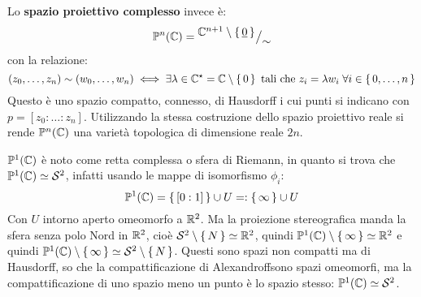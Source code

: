 Lo \textbf{spazio proiettivo complesso} invece è:
\[
  \mathbb{P}^{n} (\mathbb{C}) = {^{\textstyle \mathbb{C}^{n+1} \setminus \set{\underline{0}}}\big/_{\textstyle \sim}}
\]
con la relazione:
\[
  (z_0, \dots, z_n) \sim (w_0, \dots, w_n) \iff \exists \lambda \in \mathbb{C}^\star= \mathbb{C} \setminus \set{0} \text{ tali che } z_i = \lambda w_i \; \forall i \in \set{0, \dots, n}
\]
Questo è uno spazio compatto, connesso, di Hausdorff i cui punti si indicano con
$ p = [z_0 : \dots : z_n] $. Utilizzando la stessa costruzione dello spazio proiettivo
reale si rende $ \mathbb{P}^{n} (\mathbb{C}) $ una varietà topologica di dimensione reale $ 2n $.
\begin{example}[$ n = 1 $]
  $ \mathbb{P}^{1} (\mathbb{C}) $ è noto come retta complessa o sfera di Riemann, in quanto
  si trova che $ \mathbb{P}^{1} (\mathbb{C}) \simeq \mathcal{S}^{2} $, infatti usando le mappe di isomorfismo $ \phi_i $:
  \[
    \mathbb{P}^{1} (\mathbb{C}) = \set{ [0:1] } \cup U =: \set{\infty} \cup U
  \]
  Con $ U $ intorno aperto omeomorfo a $ \mathbb{R}^{2} $. Ma la proiezione
  stereografica manda la sfera senza polo Nord in $ \mathbb{R}^{2} $, cioè
  $ \mathcal{S}^{2} \setminus \set{N} \simeq \mathbb{R}^{2} $, quindi
  $ \mathbb{P}^{1} (\mathbb{C}) \setminus \set{\infty} \simeq \mathbb{R}^{2} $ e quindi
  $ \mathbb{P}^{1} (\mathbb{C}) \setminus \set{\infty} \simeq \mathcal{S}^{2} \setminus \set{N} $. Questi sono spazi non compatti ma
  di Hausdorff, so che la compattificazione di Alexandroff\footnotemark sono spazi omeomorfi,
  ma la compattificazione di uno spazio meno un punto è lo spazio stesso: $ \mathbb{P}^{1} (\mathbb{C}) \simeq \mathcal{S}^{2} $.
\end{example}

